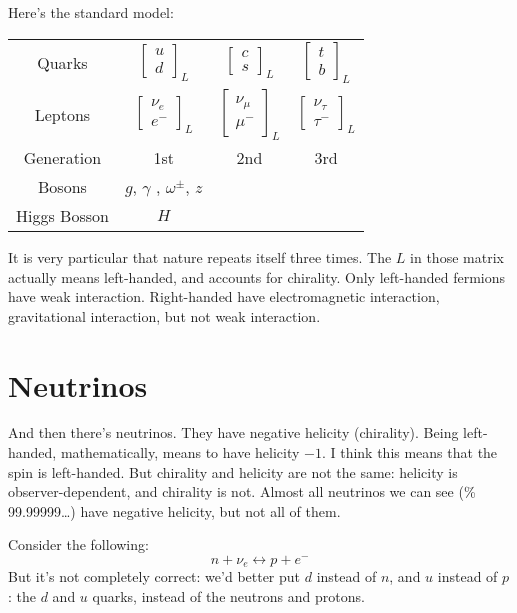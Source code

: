 Here's the standard model:
\begin{tabular}{c c c c}
Quarks & $\begin{bmatrix} u\\d \end{bmatrix}_L $ & $\begin{bmatrix} c\\s
\end{bmatrix}_L$ & $\begin{bmatrix} t\\b \end{bmatrix}_L$\\
Leptons & $\begin{bmatrix} \nu_e\\e^- \end{bmatrix}_L $ & $\begin{bmatrix}
\nu_\mu\\ \mu^-
\end{bmatrix}_L$ & $\begin{bmatrix} \nu_\tau\\ \tau^- \end{bmatrix}_L$\\
Generation & 1st & 2nd & 3rd\\
Bosons & $g$, $\gamma$ , $\omega^\pm$, $z$ \\
Higgs Bosson & $H$
\end{tabular}
It is very particular that nature repeats itself three times. The $L$ in those
matrix actually means left-handed, and accounts for chirality. Only left-handed
fermions have weak interaction. Right-handed have electromagnetic interaction,
gravitational interaction, but not weak interaction.

\section{Neutrinos}
\label{section-neutrinos}

And then there's neutrinos. They have negative helicity (chirality). Being
left-handed, mathematically, means to have helicity $-1$. I think this means
that the spin is left-handed. But chirality and helicity are not the same:
helicity is observer-dependent, and chirality is not. Almost all neutrinos we
can see (\% 99.99999…) have negative helicity, but not all of them.

Consider the following:
$$
n+\nu_e\leftrightarrow p+e^-
$$
But it's not completely correct: we'd better put $d$ instead of $n$, and $u$
instead of $p$: the $d$ and $u$ quarks, instead of the neutrons and protons.


